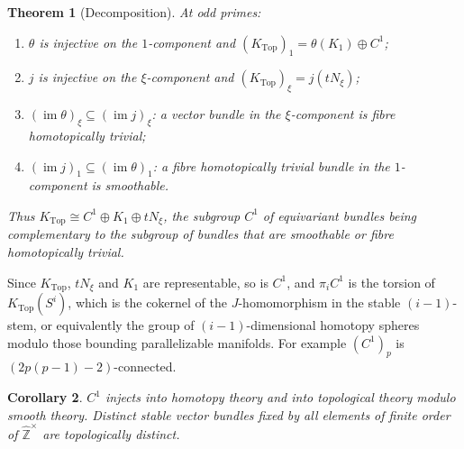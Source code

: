 \documentclass[11pt]{amsart}
\theoremstyle{plain}
\newtheorem{theorem}{Theorem}[section]
\newtheorem{corollary}[theorem]{Corollary}
\theoremstyle{definition}
\numberwithin{equation}{section}
\newcommand{\Zhat}{\widehat{\mathbb{Z}}}
\newcommand{\Ktop}{K_{\mathrm{Top}}}
\newcommand{\units}{^{\times}}
\begin{document}
\begin{theorem}[Decomposition]\label{thm:decomposition}
At odd primes:
\begin{enumerate}[label=\textup{(\arabic*)}]
\item $\theta$ is injective on the $1$-component and $(\Ktop)_1=\theta(K_1)\oplus C^1$;
\item $j$ is injective on the $\xi$-component and $(\Ktop)_\xi=j(tN_\xi)$;
\item $(\operatorname{im}\theta)_\xi\subseteq(\operatorname{im}j)_\xi$: a vector bundle in the $\xi$-component is fibre homotopically trivial;
\item $(\operatorname{im}j)_1\subseteq(\operatorname{im}\theta)_1$: a fibre homotopically trivial bundle in the $1$-component is smoothable.
\end{enumerate}
Thus $\Ktop\cong C^1\oplus K_1\oplus tN_\xi$, the subgroup $C^1$ of equivariant bundles being complementary to the subgroup of bundles that are smoothable or fibre homotopically trivial.
\end{theorem}

Since $\Ktop$, $tN_\xi$ and $K_1$ are representable, so is $C^1$, and $\pi_iC^1$ is the torsion of $\Ktop(S^i)$, which is the cokernel of the $J$-homomorphism in the stable $(i-1)$-stem, or equivalently the group of $(i-1)$-dimensional homotopy spheres modulo those bounding parallelizable manifolds.
For example $(C^1)_p$ is $(2p(p-1)-2)$-connected.

\begin{corollary}
$C^1$ injects into homotopy theory and into topological theory modulo smooth theory.
Distinct stable vector bundles fixed by all elements of finite order of $\Zhat\units$ are topologically distinct.
\end{corollary}
\end{document}
